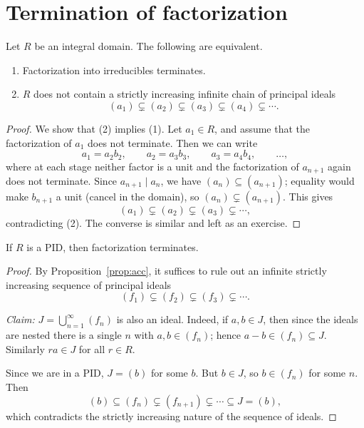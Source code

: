 \documentclass[reqno,11pt]{amsart}
\begin{document}
\section{Termination of factorization}\label{sec:termination}

\begin{proposition}\label{prop:acc}
Let $R$ be an integral domain. The following are equivalent.
\begin{enumerate}[label=(\arabic*)]
  \item Factorization into irreducibles terminates.
  \item $R$ does not contain a strictly increasing infinite chain of
  principal ideals
  \[
    (a_1)\subsetneq(a_2)\subsetneq(a_3)\subsetneq(a_4)\subsetneq\cdots.
  \]
\end{enumerate}
\end{proposition}
\begin{proof}
We show that (2) implies (1). Let $a_1\in R$, and assume that the
factorization of $a_1$ does not terminate. Then we can write
\[
  a_1=a_2b_2,\qquad a_2=a_3b_3,\qquad a_3=a_4b_4,\qquad\ldots,
\]
where at each stage neither factor is a unit and the factorization
of $a_{n+1}$ again does not terminate. Since $a_{n+1}\mid a_n$, we
have $(a_n)\subseteq(a_{n+1})$; equality would make $b_{n+1}$ a unit
(cancel in the domain), so $(a_n)\subsetneq(a_{n+1})$. This gives
\[
  (a_1)\subsetneq(a_2)\subsetneq(a_3)\subsetneq\cdots,
\]
contradicting (2). The converse is similar and left as an exercise.
\end{proof}

\begin{proposition}\label{prop:pid-terminates}
If $R$ is a PID, then factorization terminates.
\end{proposition}
\begin{proof}
By Proposition~\ref{prop:acc}, it suffices to rule out an infinite
strictly increasing sequence of principal ideals
\[
  (f_1)\subsetneq(f_2)\subsetneq(f_3)\subsetneq\cdots.
\]

\emph{Claim:} $J=\bigcup_{n=1}^\infty(f_n)$ is also an ideal.
Indeed, if $a,b\in J$, then since the ideals are nested there is a
single $n$ with $a,b\in(f_n)$; hence $a-b\in(f_n)\subseteq J$.
Similarly $ra\in J$ for all $r\in R$.

Since we are in a PID, $J=(b)$ for some $b$. But $b\in J$, so
$b\in(f_n)$ for some $n$. Then
\[
  (b)\subseteq(f_n)\subsetneq(f_{n+1})\subsetneq\cdots\subseteq J=(b),
\]
which contradicts the strictly increasing nature of the sequence of
ideals.
\end{proof}
\end{document}
